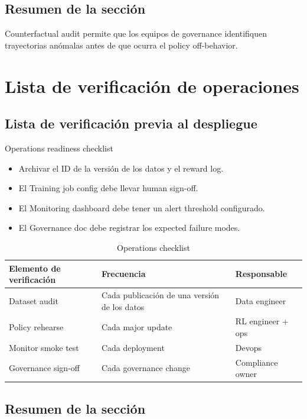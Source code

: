 \documentclass[a4paper]{article}
\begin{document}
\subsection{Resumen de la sección}

Counterfactual audit permite que los equipos de governance identifiquen trayectorias anómalas antes de que ocurra el policy off-behavior.

\section{Lista de verificación de operaciones}

\subsection{Lista de verificación previa al despliegue}

\begin{knowledgebox}{Operations readiness checklist}
\begin{itemize}
    \item Archivar el ID de la versión de los datos y el reward log.
    \item El Training job config debe llevar human sign-off.
    \item El Monitoring dashboard debe tener un alert threshold configurado.
    \item El Governance doc debe registrar los expected failure modes.
\end{itemize}
\end{knowledgebox}

\begin{table}[H]
\centering
\begin{tabular}{p{} p{} p{}}
\toprule
Elemento de verificación & Frecuencia & Responsable \\
\midrule
Dataset audit & Cada publicación de una versión de los datos & Data engineer \\
Policy rehearse & Cada major update & RL engineer + ops \\
Monitor smoke test & Cada deployment & Devops \\
Governance sign-off & Cada governance change & Compliance owner \\
\bottomrule
\end{tabular}
\caption{Operations checklist}
\end{table}

\subsection{Resumen de la sección}
\end{document}
